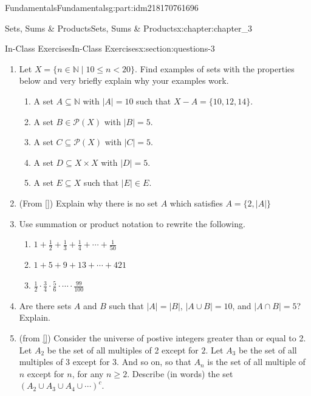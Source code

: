 \documentclass[oneside,10pt,]{book}
\newcommand{\xreffont}{\relax}
\numberwithin{equation}{section}
\newcommand{\card}[1]{\left| #1 \right|}
\newcommand{\lt}{<}
\begin{document}
\begin{partptx}{Fundamentals}{}{Fundamentals}{}{}{g:part:idm218170761696}
\begin{chapterptx}{Sets, Sums \& Products}{}{Sets, Sums \& Products}{}{}{x:chapter:chapter_3}
\typeout{************************************************}
%
\begin{sectionptx}{In-Class Exercises}{}{In-Class Exercises}{}{}{x:section:questions-3}
%
\begin{enumerate}[label=\arabic*.]
\item{}Let \(X = \{n \in \mathbb{N} \mid 10 \leq n \lt 20\}\).  Find examples of sets with the properties below and very briefly explain why your examples work.%
\begin{enumerate}[label=(\alph*)]
\item{}A set \(A \subseteq \mathbb{N}\) with \(\lvert A \rvert = 10\) such that \(X - A = \{10, 12, 14\}\).%
\item{}A set \(B \in \mathcal{P}(X)\) with \(\lvert B\rvert = 5\).%
\item{}A set \(C \subseteq \mathcal{P}(X)\) with \(\lvert C\rvert = 5\).%
\item{}A set \(D \subseteq X \times X\) with \(\lvert D\rvert = 5\).%
\item{}A set \(E \subseteq X\) such that \(\lvert E\rvert \in E\).%
\end{enumerate}
%
\item{}(From \hyperlink{x:biblio:biblio-levin-2020}{[{\xreffont 3}]}) Explain why there is no set \(A\) which satisfies \(A = \{2, \card{A}\}\)%
\item{}Use summation or product notation to rewrite the following.%
\begin{enumerate}[label=(\alph*)]
\item{}\(\displaystyle 1 + \frac{1}{2} + \frac{1}{3}+ \frac{1}{4}+ \cdots + \frac{1}{50}\)%
\item{}\(\displaystyle 1 + 5 + 9 + 13 + \cdots + 421\)%
\item{}\(\displaystyle \frac{1}{2}\cdot \frac{3}{4}\cdot \frac{5}{6}\cdot \cdots 			 
\cdot\frac{99}{100}\)%
\end{enumerate}
%
\item{}Are there sets \(A\) and \(B\) such that \(|A| = |B|\), \(|A\cup B| = 10\), and \(|A\cap B| = 5\)?  Explain.%
\item{}(from \hyperlink{x:biblio:biblio-levin-2020}{[{\xreffont 3}]}) Consider the universe of postive integers greater than or equal to 2. Let \(A_2\) be the set of all multiples of 2 except for \(2\). Let \(A_3\) be the set of all multiples of 3 except for 3. And so on, so that \(A_n\) is the set of all multiple of \(n\) except for \(n\), for any \(n \ge 2\). Describe (in words) the set \(\left(A_2 \cup A_3 \cup A_4 \cup \cdots \right)^c\).%

\end{enumerate}
\end{sectionptx}
\end{chapterptx}
\end{partptx}
\end{document}
